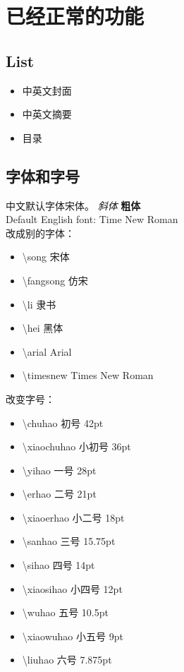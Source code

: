 
\section{已经正常的功能}
\subsection{List}
	\begin{itemize}
		\item 中英文封面
		\item 中英文摘要
		\item 目录
	\end{itemize}
\subsection{字体和字号}

	中文默认字体宋体。 \textit{斜体} \textbf{粗体} \\
	Default English font: Time New Roman\\
	
	 改成别的字体：
	 \begin{itemize}
	 \item {\song \textbackslash song 宋体}
	 \item {\fangsong \textbackslash fangsong 仿宋}
	 \item {\li \textbackslash li 隶书}
	 \item {\hei \textbackslash hei 黑体}
	 \item {\arial \textbackslash arial Arial}
	 \item {\timesnew \textbackslash timesnew Times New Roman}
	 \end{itemize}
	 
	 \vspace*{1em}改变字号：
	 \begin{itemize}
		 \item {\chuhao \textbackslash chuhao 初号 42pt}
		 \item {\xiaochuhao \textbackslash xiaochuhao 小初号 36pt}
		 \item {\yihao \textbackslash yihao 一号 28pt}
		 \item {\erhao  \textbackslash erhao 二号 21pt}
		 \item {\xiaoerhao \textbackslash xiaoerhao 小二号 18pt}
		 \item {\sanhao \textbackslash sanhao 三号 15.75pt}
		 \item {\sihao \textbackslash sihao 四号 14pt}
		 \item {\xiaosihao \textbackslash xiaosihao 小四号 12pt}
		 \item {\wuhao \textbackslash wuhao 五号 10.5pt}
		 \item {\xiaowuhao \textbackslash xiaowuhao 小五号 9pt}
		 \item {\liuhao \textbackslash liuhao 六号 7.875pt}
		 
	 \end{itemize}
	 
